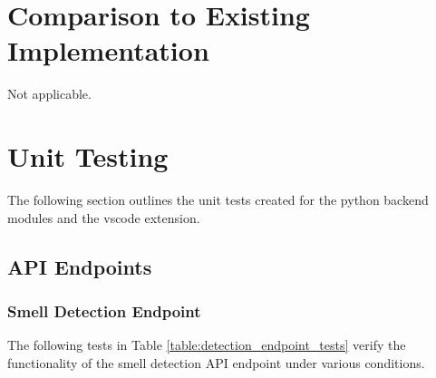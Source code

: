 \documentclass[12pt, titlepage]{article}
\begin{document}
\section{Comparison to Existing Implementation}

Not applicable.

\section{Unit Testing}

The following section outlines the unit tests created for the python
backend modules and the vscode extension.

\newcommand{\testcount}{\stepcounter{testcase}\thetestcase}
\renewcommand{\arraystretch}{1.2} %

\subsection{API Endpoints}

\subsubsection{Smell Detection Endpoint}
The following tests in Table \ref{table:detection_endpoint_tests} verify the functionality of the smell detection API endpoint under various conditions.
\end{document}
